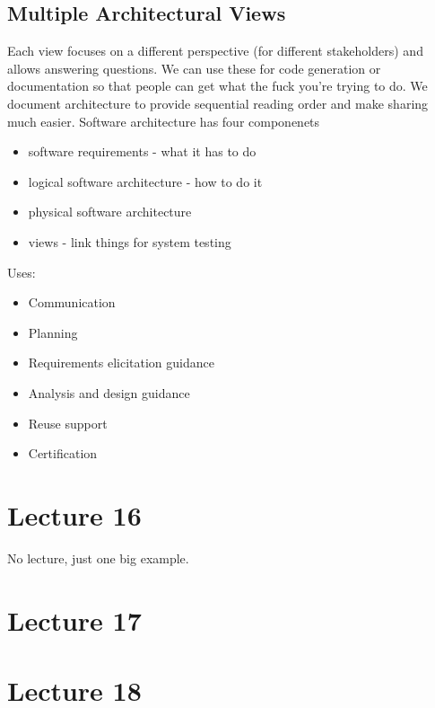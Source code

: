 \documentclass{article}
\begin{document}
\subsection*{Multiple Architectural Views} %
\label{sub:multiple_architectural_views}
Each view focuses on a different perspective (for different stakeholders) and allows answering questions. We can use these for code generation or documentation so that people can get what the fuck you're trying to do. We document architecture to provide sequential reading order and make sharing much easier. Software architecture has four componenets
\begin{itemize}
    \item software requirements - what it has to do
    \item logical software architecture - how to do it
    \item physical software architecture
    \item views - link things for system testing
\end{itemize}
Uses:
\begin{itemize}
    \item  Communication
    \item Planning
    \item Requirements elicitation guidance
    \item Analysis and design guidance
    \item Reuse support
    \item Certification
\end{itemize}

\section*{Lecture 16} %
\label{sec:lecture_16}
No lecture, just one big example.

\section*{Lecture 17} %
\label{sec:lecture_17}


\section*{Lecture 18} %
\label{sec:lecture_18}
\end{document}
